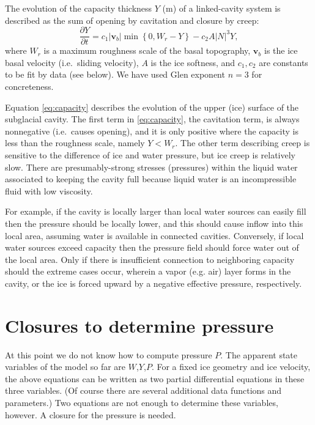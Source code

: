 \documentclass[12pt,final]{amsart}%
\newcommand\bv{\mathbf{v}}
\begin{document}
The evolution of the capacity thickness $Y$ (m) of a linked-cavity system is described as the sum of opening by cavitation and closure by creep:
\begin{equation}
\frac{\partial Y}{\partial t} = c_1 |\bv_b| \min\left\{0,W_r - Y\right\} - c_2 A |N|^3 Y, \label{eq:capacity}
\end{equation}
where $W_r$ is a maximum roughness scale of the basal topography, $\bv_b$ is the ice basal velocity (i.e.~sliding velocity), $A$ is the ice softness, and $c_1,c_2$ are constants to be fit by data (see below).  We have used Glen exponent $n=3$ for concreteness.

Equation \eqref{eq:capacity} describes the evolution of the upper (ice) surface of the subglacial cavity.  The first term in \eqref{eq:capacity}, the cavitation term, is always nonnegative (i.e.~causes opening), and it is only positive where the capacity is less than the roughness scale, namely $Y<W_r$.  The other term describing creep is sensitive to the difference of ice and water pressure, but ice creep is relatively slow.  There are presumably-strong stresses (pressures) within the liquid water associated to keeping the cavity full because liquid water is an incompressible fluid with low viscosity.

For example, if the cavity is locally larger than local water sources can easily fill then the pressure should be locally lower, and this should cause inflow into this local area, assuming water is available in connected cavities.  Conversely, if local water sources exceed capacity then the pressure field should force water out of the local area.  Only if there is insufficient connection to neighboring capacity should the extreme cases occur, wherein a vapor (e.g. air) layer forms in the cavity, or the ice is forced upward by a negative effective pressure, respectively.


\section{Closures to determine pressure}

At this point we do not know how to compute pressure $P$.  The apparent state variables of the model so far are $W$,$Y$,$P$.  For a fixed ice geometry and ice velocity, the above equations can be written as two partial differential equations in these three variables.   (Of course there are several additional data functions and parameters.)  Two equations are not enough to determine these variables, however.  A closure for the pressure is needed.
\end{document}
